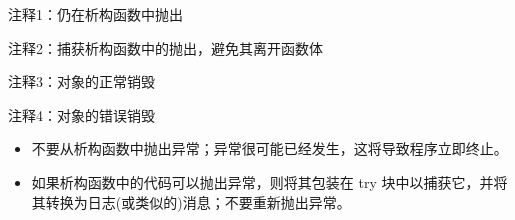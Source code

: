 {\footnotesize
注释1：仍在析构函数中抛出

注释2：捕获析构函数中的抛出，避免其离开函数体

注释3：对象的正常销毁

注释4：对象的错误销毁
}


\begin{itemize}
\item
不要从析构函数中抛出异常；异常很可能已经发生，这将导致程序立即终止。

\item
如果析构函数中的代码可以抛出异常，则将其包装在 try 块中以捕获它，并将其转换为日志(或类似的)消息；不要重新抛出异常。
\end{itemize}
























